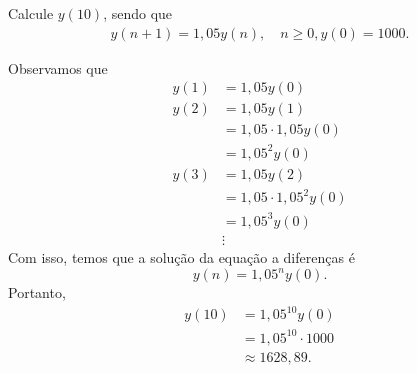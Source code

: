 \begin{exeresol}
  Calcule $y(10)$, sendo que
  \begin{align}
    y(n+1) = 1,05y(n),\quad n\geq0,
    y(0) = 1000.
  \end{align}
\end{exeresol}
\begin{resol}
  Observamos que
  \begin{align}
    y(1) &= 1,05y(0)\\
    y(2) &= 1,05y(1)\\
        &= 1,05\cdot 1,05y(0) \\
        &= 1,05^2y(0)\\
    y(3) &= 1,05y(2)\\
        &=1,05\cdot 1,05^2y(0)\\
        &= 1,05^3y(0)\\
        &\vdots
  \end{align}
  Com isso, temos que a solução da equação a diferenças é
  \begin{equation}
    y(n) = 1,05^ny(0).
  \end{equation}
  Portanto,
  \begin{align}
    y(10) &= 1,05^{10}y(0) \\
           &= 1,05^{10}\cdot 1000 \\
           &\approx 1628,89.
  \end{align}
\end{resol}

